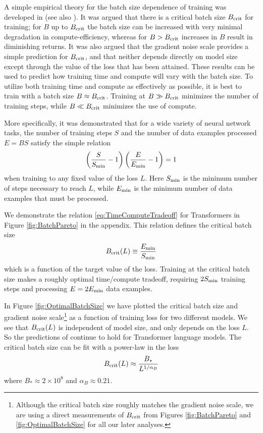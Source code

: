 \documentclass[english]{article}
\newcommand{\be}{\begin{equation}}
\newcommand{\ee}{\end{equation}}
\begin{document}
A simple empirical theory for the batch size dependence of training was developed in \cite{1812.06162} (see also \cite{1811.03600, DBLP:journals/corr/abs-1907-04164}).  It was argued that there is a critical batch size $B_{\rm crit}$ for training; for $B$ up to $B_{\rm crit}$  the batch size can be increased with very minimal degradation in compute-efficiency, whereas for $B > B_{\rm crit}$ increases in $B$ result in diminishing returns.  It was also argued that the gradient noise scale provides a simple prediction for $B_{\rm crit}$, and that neither depends directly on model size except through the value of the loss that has been attained.  These results can be used to predict how training time and compute will vary with the batch size.  To utilize both training time and compute as effectively as possible, it is best to train with a batch size $B \approx B_{\rm crit}$.  Training at $B \gg B_{\rm crit}$  minimizes the number of training steps, while $B \ll B_{\rm crit}$ minimizes the use of compute.

More specifically, it was demonstrated that for a wide variety of neural network tasks, the number of training steps $S$ and the number of data examples processed $E = B S$ satisfy the simple relation
\be
\label{eq:TimeComputeTradeoff}
\left( \frac{S}{S_{\rm min}} -1 \right) \left( \frac{E}{E_{\rm min}} - 1 \right) = 1
\ee
when training to any fixed value of the loss $L$.  Here $S_{\rm min}$ is the minimum number of steps necessary to reach $L$, while $E_{\rm min}$ is the minimum number of data examples that must be processed. 

We demonstrate the relation \eqref{eq:TimeComputeTradeoff} for Transformers in Figure \ref{fig:BatchPareto} in the appendix. This relation defines the critical batch size 
\be
\label{eq:DefinitionBcrit}
B_{\rm crit}(L) \equiv \frac{E_{\rm min}}{S_{\rm min}}
\ee
which is a function of the target value of the loss.  Training at the critical batch size makes a roughly optimal time/compute tradeoff, requiring $2 S_{\rm min}$ training steps and processing $E = 2 E_{\rm min}$ data examples.  

In Figure \ref{fig:OptimalBatchSize} we have plotted the critical batch size and gradient noise scale\footnote{Although the critical batch size roughly matches the gradient noise scale, we are using a direct measurements of $B_{\rm crit}$ from Figures \ref{fig:BatchPareto} and \ref{fig:OptimalBatchSize} for all our later analyses.  } as a function of training loss for two different models.  We see that $B_{\rm crit}(L)$ is  independent of model size, and only depends on the loss $L$.  So the predictions of \cite{1812.06162} continue to hold for Transformer language models.  The critical batch size can be fit with a power-law in the loss
\be
B_{\rm crit}(L) \approx \frac{B_*}{L^{1/\alpha_B}}
\ee
where $B_* \approx 2 \times 10^8$ and $\alpha_B \approx 0.21$.  
\end{document}
